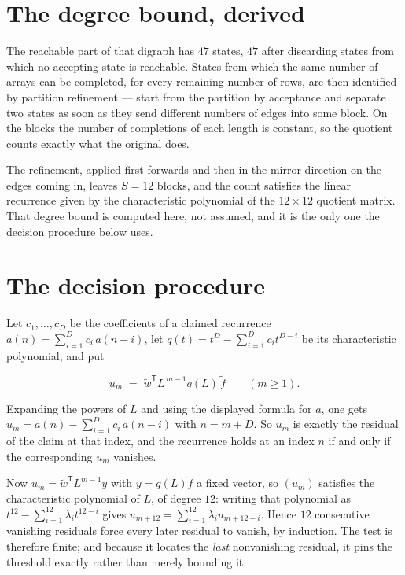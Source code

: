 \documentclass[11pt]{article}
\theoremstyle{definition}
\begin{document}
\section{The degree bound, derived}

The reachable part of that digraph has $47$ states, $47$ after discarding states from which no accepting state is reachable. States from which the same number of arrays can be completed, for every remaining number of rows, are then identified by partition refinement --- start from the partition by acceptance and separate two states as soon as they send different numbers of edges into some block. On the blocks the number of completions of each length is constant, so the quotient counts exactly what the original does.

The refinement, applied first forwards and then in the mirror direction on the edges coming in, leaves $S = 12$ blocks, and the count satisfies the linear recurrence given by the characteristic polynomial of the $12 \times 12$ quotient matrix. That degree bound is computed here, not assumed, and it is the only one the decision procedure below uses.

\section{The decision procedure}

Let $c_1,\dots,c_D$ be the coefficients of a claimed recurrence $a(n) = \sum_{i=1}^{D} c_i\,a(n-i)$, let $q(t) = t^{D} - \sum_{i=1}^{D} c_i t^{D-i}$ be its characteristic polynomial, and put

\[u_m \;=\; \tilde w^{\mathsf T} L^{\,m-1} q(L)\,\tilde f \qquad (m \ge 1).\]

Expanding the powers of $L$ and using the displayed formula for $a$, one gets $u_m = a(n) - \sum_{i=1}^{D} c_i\,a(n-i)$ with $n = m + D$. So $u_m$ is exactly the residual of the claim at that index, and the recurrence holds at an index $n$ if and only if the corresponding $u_m$ vanishes.

Now $u_m = \tilde w^{\mathsf T} L^{m-1} y$ with $y = q(L)\tilde f$ a fixed vector, so $(u_m)$ satisfies the characteristic polynomial of $L$, of degree $12$: writing that polynomial as $t^{12} - \sum_{i=1}^{12} \lambda_i t^{12-i}$ gives $u_{m+12} = \sum_{i=1}^{12} \lambda_i u_{m+12-i}$. Hence $12$ consecutive vanishing residuals force every later residual to vanish, by induction. The test is therefore finite; and because it locates the {\itshape last} nonvanishing residual, it pins the threshold exactly rather than merely bounding it.
\end{document}
